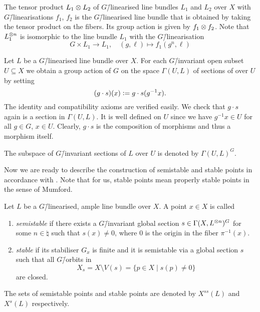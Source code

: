 \begin{remark}
	The tensor product $L_1 \otimes L_2$ of $G$\=/linearised line bundles $L_1$ and $L_2$ over $X$ with $G$\=/linearisations $f_1$, $f_2$ is the $G$\=/linearised line bundle that is obtained by taking the tensor product on the fibers. Its group action is given by $f_1 \otimes f_2$. Note that $L_1^{\otimes n}$ is isomorphic to the line bundle $L_1$ with the $G$\=/linearisation
	$$G\times L_1 \longrightarrow L_1,\quad (g, \ell) \mapsto f_1(g^n, \ell)$$
\end{remark}

\begin{remark}
	Let $L$ be a $G$\=/linearised line bundle over $X$. For each $G$\=/invariant open subset $U\subseteq X$ we obtain a group action of $G$ on the space $\Gamma(U,L)$ of sections of over $U$ by setting
	$$(g\cdot s)(x) \mathrel{\mathop:}= g\cdot s(g^{-1}x).$$
	The identity and compatibility axioms are verified easily. We check that $g\cdot s$ again is a section in $\Gamma(U,L)$. It is well defined on $U$ since we have $g^{-1}x\in U$ for all $g\in G$, $x\in U$. Clearly, $g\cdot s$ is the composition of morphisms and thus a morphism itself.
	
	The subspace of $G$\=/invariant sections of $L$ over $U$ is denoted by $\Gamma(U,L)^G$.
\end{remark}

Now we are ready to describe the construction of semistable and stable points in accordance with \cite[Definition 1.7 \& 1.8]{git}. Note that for us, stable points mean properly stable points in the sense of Mumford.

\begin{defi}
	Let $L$ be a $G$\=/linearised, ample line bundle over $X$. A point $x\in X$ is called
	\begin{enumerate}[label={\upshape(\roman*)}]
		\item \emph{semistable} if there exists a $G$\=/invariant global section $s\in\Gamma(X,L^{\otimes n})^G$ for some $n\in\natural$ such that $s(x)\neq 0$, where $0$ is the origin in the fiber $\pi^{-1}(x)$.
		\item \emph{stable} if its stabiliser $G_x$ is finite and it is semistable via a global section $s$ such that all $G$\=/orbits in 
		$$X_s = X\setminus V(s) = \{p\in X\mid s(p) \neq 0 \}$$
		are closed.
	\end{enumerate}
	The sets of semistable points and stable points are denoted by $X^{ss}(L)$ and $X^{s}(L)$ respectively.
\end{defi}


